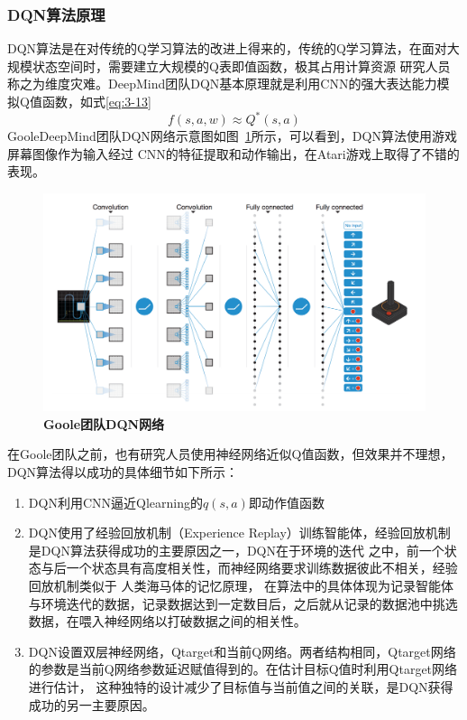 \subsubsection{DQN算法原理}
DQN算法是在对传统的Q学习算法的改进上得来的，传统的Q学习算法，在面对大规模状态空间时，需要建立大规模的Q表即值函数，极其占用计算资源
研究人员称之为维度灾难。DeepMind团队DQN基本原理就是利用CNN的强大表达能力模拟Q值函数，如式\eqref{eq:3-13}
\begin{equation}
  f(s,a,w)\approx Q^*(s,a)
  \label{eq:3-13}
\end{equation}
GooleDeepMind团队DQN网络示意图如图~\ref{fig:3-5}所示，可以看到，DQN算法使用游戏屏幕图像作为输入经过
CNN的特征提取和动作输出，在Atari游戏上取得了不错的表现。
\begin{figure}[H]
  \centering
  \includegraphics[width=0.9\linewidth]{fig/dqn1.png}
  \caption{\textbf{Goole团队DQN网络}}
  \label{fig:3-5}
\end{figure}

在Goole团队之前，也有研究人员使用神经网络近似Q值函数，但效果并不理想，DQN算法得以成功的具体细节如下所示：
\begin{enumerate}
  \item DQN利用CNN逼近Qlearning的$q(s,a)$即动作值函数
  \item DQN使用了经验回放机制（Experience Replay）训练智能体，经验回放机制是DQN算法获得成功的主要原因之一，DQN在于环境的迭代
   之中，前一个状态与后一个状态具有高度相关性，而神经网络要求训练数据彼此不相关，经验回放机制类似于 人类海马体的记忆原理，
   在算法中的具体体现为记录智能体与环境迭代的数据，记录数据达到一定数目后，之后就从记录的数据池中挑选数据，在喂入神经网络以打破数据之间的相关性。
  \item DQN设置双层神经网络，Qtarget和当前Q网络。两者结构相同，Qtarget网络的参数是当前Q网络参数延迟赋值得到的。在估计目标Q值时利用Qtarget网络进行估计，
  这种独特的设计减少了目标值与当前值之间的关联，是DQN获得成功的另一主要原因。
  
\end{enumerate}

